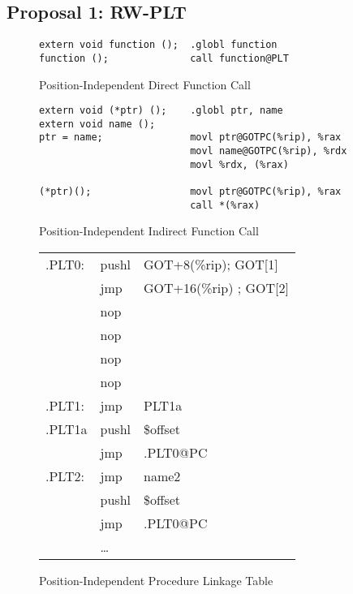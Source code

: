 

\subsection{Proposal 1: RW-PLT}

\begin{figure}[H]
\caption{Position-Independent Direct Function Call}
\begin{verbatim}
extern void function ();  .globl function
function ();              call function@PLT
\end{verbatim}
\end{figure}

\begin{figure}[H]
\caption{Position-Independent Indirect Function Call}
\begin{verbatim}
extern void (*ptr) ();    .globl ptr, name
extern void name ();
ptr = name;               movl ptr@GOTPC(%rip), %rax
                          movl name@GOTPC(%rip), %rdx
                          movl %rdx, (%rax)

(*ptr)();                 movl ptr@GOTPC(%rip), %rax
                          call *(%rax)
\end{verbatim}
\end{figure}

\begin{figure}[H]
\caption{Position-Independent Procedure Linkage Table}
\begin{tabular}{lll}
.PLT0: & pushl & GOT+8(\%rip); GOT[1]\\
& jmp &GOT+16(\%rip) ; GOT[2] \\
& nop & \\
& nop & \\
& nop & \\
& nop & \\
.PLT1: & jmp & PLT1a\\
.PLT1a& pushl & \$offset \\
&jmp &.PLT0@PC \\
.PLT2: & jmp& name2\\
&pushl & \$offset \\
& jmp & .PLT0@PC \\
&\dots\\
\end{tabular}
\end{figure}

